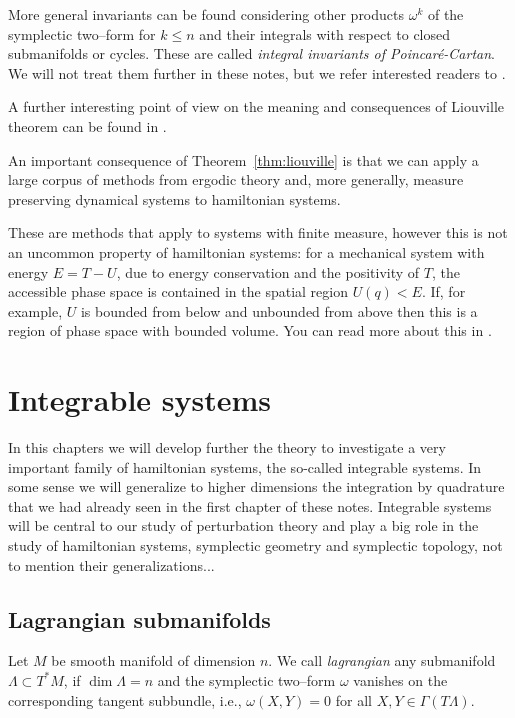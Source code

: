 \documentclass[english,fontsize=11pt,paper=a5,oneside]{scrbook}
\theoremstyle{definition}
\begin{document}
More general invariants can be found considering other products $\omega^k$ of the symplectic two--form for $k\leq n$ and their integrals with respect to closed submanifolds or cycles.
These are called \emph{integral invariants of Poincar\'e-Cartan}. We will not treat them further in these notes, but we refer interested readers to \cite[Chapter 9.44]{book:arnold}.

A further interesting point of view on the meaning and consequences of Liouville theorem can be found in \cite[Chapters 4.2.1-4.2.2]{lectures:tong}.

An important consequence of Theorem~\ref{thm:liouville} is that we can apply a large corpus of methods from ergodic theory and, more generally, measure preserving dynamical systems to hamiltonian systems.

These are methods that apply to systems with finite measure, however this is not an uncommon property of hamiltonian systems: for a mechanical system with energy $E = T- U$, due to energy conservation and the positivity of $T$, the accessible phase space is contained in the spatial region $U(q) < E$. If, for example, $U$ is bounded from below and unbounded from above then this is a region of phase space with bounded volume.
You can read more about this in \cite[Chapter 3.16.C-D]{book:arnold}.

\chapter{Integrable systems}

In this chapters we will develop further the theory to investigate a very important family of hamiltonian systems, the so-called integrable systems.
In some sense we will generalize to higher dimensions the integration by quadrature that we had already seen in the first chapter of these notes.
Integrable systems will be central to our study of perturbation theory and play a big role in the study of hamiltonian systems, symplectic geometry and symplectic topology, not to mention their generalizations...

\section{Lagrangian submanifolds}

\begin{tcolorbox}
  Let $M$ be smooth manifold of dimension $n$.
  We call \emph{lagrangian} any submanifold $\Lambda \subset T^*M$, if $\dim \Lambda = n$ and the symplectic two--form $\omega$ vanishes on the corresponding tangent subbundle, i.e., $\omega(X, Y) = 0$ for all $X,Y \in \Gamma(T\Lambda)$.
\end{tcolorbox}
\end{document}
